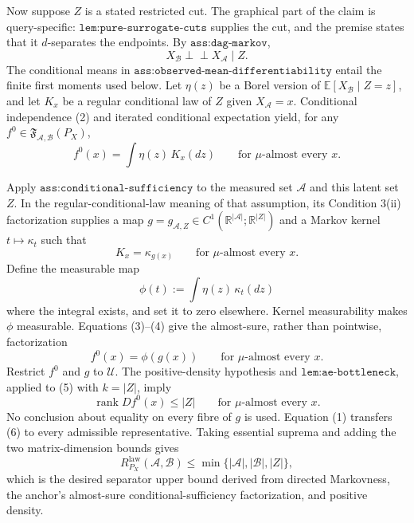 Now suppose \(Z\) is a stated restricted cut.  The graphical part of the claim is query-specific: \(\texttt{lem:pure-surrogate-cuts}\) supplies the cut, and the premise states that it \(d\)-separates the endpoints.  By \(\texttt{ass:dag-markov}\),
\[
 X_{\mathcal B}\mathbin{\perp\!\!\!\perp}X_{\mathcal A}\mid Z. \tag{2}
\]
The conditional means in \(\texttt{ass:observed-mean-differentiability}\) entail the finite first moments used below.  Let \(\eta(z)\) be a Borel version of \(\mathbb E[X_{\mathcal B}\mid Z=z]\), and let \(K_x\) be a regular conditional law of \(Z\) given \(X_{\mathcal A}=x\).  Conditional independence (2) and iterated conditional expectation yield, for any \(f^0\in\mathfrak F_{\mathcal A,\mathcal B}(P_X)\),
\[
 f^0(x)=\int\eta(z)\,K_x(dz)
 \qquad\text{for }\mu\text{-almost every }x. \tag{3}
\]

Apply \(\texttt{ass:conditional-sufficiency}\) to the measured set \(\mathcal A\) and this latent set \(Z\).  In the regular-conditional-law meaning of that assumption, its Condition 3(ii) factorization supplies a map \(g=g_{\mathcal A,Z}\in C^1(\mathbb R^{|\mathcal A|};\mathbb R^{|Z|})\) and a Markov kernel \(t\mapsto\kappa_t\) such that
\[
 K_x=\kappa_{g(x)}
 \qquad\text{for }\mu\text{-almost every }x. \tag{4}
\]
Define the measurable map
\[
 \phi(t):=\int\eta(z)\,\kappa_t(dz)
\]
where the integral exists, and set it to zero elsewhere.  Kernel measurability makes \(\phi\) measurable.  Equations (3)--(4) give the almost-sure, rather than pointwise, factorization
\[
 f^0(x)=\phi(g(x))
 \qquad\text{for }\mu\text{-almost every }x. \tag{5}
\]
Restrict \(f^0\) and \(g\) to \(\mathcal U\).  The positive-density hypothesis and \(\texttt{lem:ae-bottleneck}\), applied to (5) with \(k=|Z|\), imply
\[
 \operatorname{rank}Df^0(x)\leq |Z|
 \qquad\text{for }\mu\text{-almost every }x. \tag{6}
\]
No conclusion about equality on every fibre of \(g\) is used.  Equation (1) transfers (6) to every admissible representative.  Taking essential suprema and adding the two matrix-dimension bounds gives
\[
 R^{\mathrm{law}}_{P_X}(\mathcal A,\mathcal B)
 \leq\min\{|\mathcal A|,|\mathcal B|,|Z|\},
\]
which is the desired separator upper bound derived from directed Markovness, the anchor's almost-sure conditional-sufficiency factorization, and positive density.

